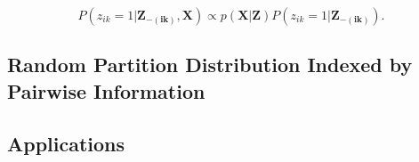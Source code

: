 \begin{equation}
  P(z_{ik}=1|\bm{Z_{-(ik)},X})  \propto p(\bm{X|Z}) P(z_{ik}=1|\bm{Z_{-(ik)}}).
\end{equation}


\subsection{Random Partition Distribution Indexed by Pairwise Information}




\subsection{Applications}


